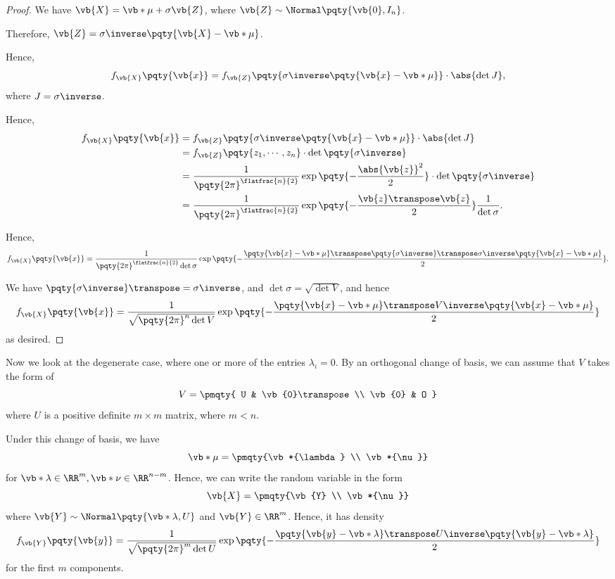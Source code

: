\begin{proof}
    We have \(\vb{X} = \vb*{\mu} + \sigma \vb{Z}\), where \(\vb{Z} \sim \Normal\pqty{\vb{0}, I_n}\).

    Therefore, \(\vb{Z} = \sigma\inverse \pqty{\vb{X} - \vb*{\mu}}\).

    Hence,
    \[
        f_{\vb{X}} \pqty{\vb{x}} = f_{\vb{Z}} \pqty{\sigma\inverse \pqty{\vb{x} - \vb*{\mu}}} \cdot \abs{\det J},
    \]
    where \(J = \sigma\inverse\).

    Hence,
    \begin{align*}
        f_{\vb{X}}\pqty{\vb{x}} &= f_{\vb{Z}} \pqty{\sigma\inverse \pqty{\vb{x} - \vb*{\mu}}} \cdot \abs{\det J} \\
        &= f_{\vb{Z}} \pqty{z_1, \cdots, z_n} \cdot \det\pqty{\sigma \inverse} \\
        &= \frac{1}{\pqty{2 \pi}^{\flatfrac{n}{2}}} \exp\pqty{- \frac{\abs{\vb{z}}^2}{2}} \cdot \det\pqty{\sigma\inverse} \\
        &= \frac{1}{\pqty{2 \pi}^{\flatfrac{n}{2}}} \exp\pqty{- \frac{\vb{z}\transpose \vb{z}}{2}} \frac{1}{\det \sigma}.
    \end{align*}

    Hence,
    \[
        f_{\vb{X}}\pqty{\vb{x}} = \frac{1}{\pqty{2 \pi}^{\flatfrac{n}{2}} \det \sigma} \exp\pqty{- \frac{\pqty{\vb{x} - \vb*{\mu}}\transpose \pqty{\sigma\inverse}\transpose \sigma\inverse \pqty{\vb{x} - \vb*{\mu}}}{2}}.
    \]

    We have \(\pqty{\sigma\inverse}\transpose = \sigma\inverse\), and \(\det\sigma = \sqrt{\det V}\), and hence
    \[
        f_{\vb{X}}\pqty{\vb{x}} = \frac{1}{\sqrt{\pqty{2\pi}^n \det V}} \exp\pqty{- \frac{\pqty{\vb{x} - \vb*{\mu}}\transpose V\inverse \pqty{\vb{x} - \vb*{\mu}}}{2}}
    \]
    as desired.
\end{proof}

Now we look at the degenerate case, where one or more of the entries \(\lambda_i = 0\). By an orthogonal change of basis, we can assume that \(V\) takes the form of
\[
    V = \pmqty{
        U & \vb{0}\transpose \\ \vb{0} & O
    }
\]
where \(U\) is a positive definite \(m \times m\) matrix, where \(m < n\).

Under this change of basis, we have
\[
    \vb*{\mu} = \pmqty{\vb*{\lambda} \\ \vb*{\nu}}
\]
for \(\vb*{\lambda} \in \RR^m, \vb*{\nu} \in \RR^{n - m}\). Hence, we can write the random variable in the form
\[
    \vb{X} = \pmqty{\vb{Y} \\ \vb*{\nu}}
\]
where \(\vb{Y} \sim \Normal\pqty{\vb*{\lambda}, U}\) and \(\vb{Y} \in \RR^m\). Hence, it has density
\[
    f_{\vb{Y}} \pqty{\vb{y}} = \frac{1}{\sqrt{\pqty{2 \pi}^m \det U}} \exp \pqty{- \frac{\pqty{\vb{y} - \vb*{\lambda}}\transpose U\inverse \pqty{\vb{y} - \vb*{\lambda}}}{2}}
\]
for the first \(m\) components.

